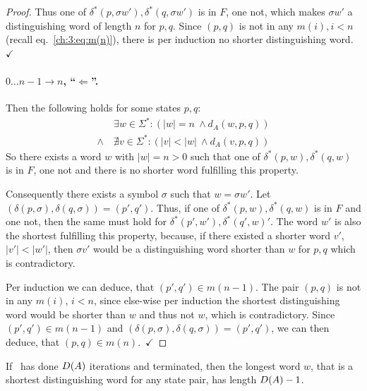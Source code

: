 \begin{proof}
	Thus one of $\delta^*(p, \sigma w'),\delta^*(q, \sigma w')$ is in $F$, one not, which makes $\sigma w'$ a distinguishing word of length $n$ for $p,q$. Since $(p,q)$ is not in any $m(i), i<n$ (recall eq.~\ref{ch:3:eq:m(n)}), there is per induction no shorter distinguishing word.\ $\checkmark$ 
	
	\paragraph*{$0\ldots n-1 \rightarrow n$, ``$\Leftarrow$''.} 
	Then the following holds for some states $p,q$:
	\begin{align*}
	&\exists w\in\Sigma^*\colon (|w| = n\ \land d_A(w, p, q))\\
	\land\ &\nexists v\in\Sigma^*\colon (|v| < |w|\ \land d_A(v, p, q))
	\end{align*}
	So there exists a word $w$ with $|w|=n>0$ such that one of $\delta^*(p, w),\delta^*(q, w)$ is in $F$, one not and there is no shorter word fulfilling this property.
	
	Consequently there exists a symbol $\sigma$ such that $w = \sigma w'$. Let $(\delta(p,\sigma),\delta(q,\sigma)) = (p',q')$. Thus, if one of $\delta^*(p, w),\delta^*(q, w)$ is in $F$ and one not, then the same must hold for $\delta^*(p', w'),\delta^*(q', w)'$. The word $w'$ is also the shortest fulfilling this property, because, if there existed a shorter word $v'$, $|v'| < |w'|$, then $\sigma v'$ would be a distinguishing word shorter than $w$ for $p,q$ which is contradictory.
	
	Per induction we can deduce, that $(p',q')\in m(n-1)$. The pair $(p,q)$ is not in any $m(i)$, $i<n$, since else-wise per induction the shortest distinguishing word would be shorter than $w$ and thus not $w$, which is contradictory. Since $(p',q')\in m(n-1)$ and $(\delta(p,\sigma),\delta(q,\sigma)) = (p',q')$, we can then deduce, that $(p,q)\in m(n)$.\ $\checkmark$ 
\end{proof}

\begin{lemma}\label{ch:3:semantics-of-D(A)}
    If \CompDist\ has done $D(A)$ iterations and terminated, then the longest word $w$, that is a shortest distinguishing word for any state pair, has length $D(A)-1$.
\end{lemma}

